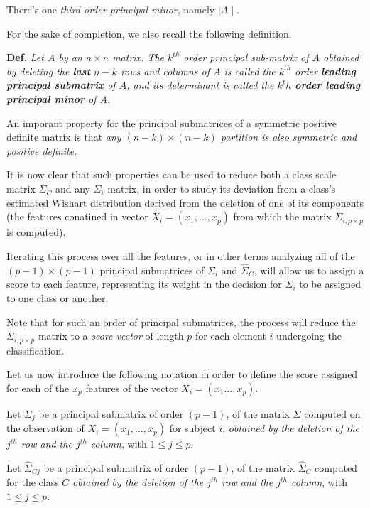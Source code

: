 \documentclass[12pt,openright,twoside,a4paper]{book}
\begin{document}
There's one \textit{third order principal minor}, namely $\mid A\mid$.

\vspace{5mm}

For the sake of completion, we also recall the following definition.

\textbf{Def.} \textit{Let $A$ by an $n\times n$ matrix. The $k^{th}$ order principal sub-matrix of $A$ obtained by deleting the \textbf{last} $n-k$ rows and columns of $A$ is called the $k^{th}$ order \textbf{leading principal submatrix} of $A$, and its determinant is called the  $k^{t}h$ \textbf{order leading principal minor} of A.}
\vspace{5mm}

An imporant property for the principal submatrices of a symmetric positive definite matrix is that \textit{any $(n-k)\times (n-k)$ partition is also symmetric and positive definite.}

It is now clear that such properties can be used to reduce both a class scale matrix $\hat{\Sigma}_C$ and any $\Sigma_i$ matrix, in order to study its deviation from a class's estimated Wishart distribution derived from the deletion of one of its components (the features conatined in vector $X_i=(x_1,...,x_p)$ from which the matrix $\Sigma_{i,p\times p}$ is computed).

Iterating this process over all the features, or in other terms analyzing all of the $(p-1)\times (p-1)$ principal submatrices of $\Sigma_i$ and $\hat{\Sigma}_C$, will allow us to assign a score to each feature, representing its weight in the decision for $\Sigma_{i}$ to be assigned to one class or another.

Note that for such an order of principal submatrices, the process will reduce the $\Sigma_{i,p \times p}$ matrix to a \textit{score vector} of length $p$ for each element $i$ undergoing the classification.

Let us now introduce the following notation in order to define the score assigned for each of the $x_p$ features of the vector $X_i=(x_1...,x_p)$.

Let $\Sigma_j$ be a principal submatrix of order $(p-1)$, of the matrix $\Sigma$ computed on the observation of $X_i=(x_1,...,x_p)$ for subject $i$, \textit{obtained by the deletion of the $j^{th}$ row and the $j^{th}$ column}, with $ 1\leq j\leq p$.
\vspace{5mm}

Let  $\hat{\Sigma}_{Cj}$  be a principal submatrix of order $(p-1)$, of the matrix $\hat{\Sigma}_C$ computed for the class $C$ \textit{obtained by the deletion of the $j^{th}$ row and the $j^{th}$ column}, with $ 1\leq j\leq p$.
\vspace{5mm}
\end{document}
